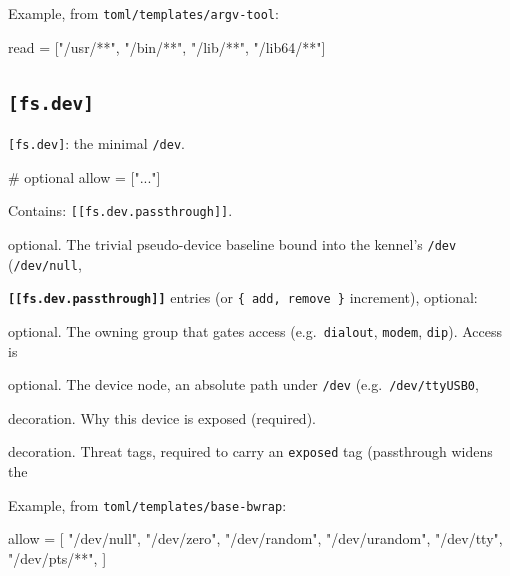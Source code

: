 Example, from \texttt{toml/templates/argv-tool}:

\begin{kennelcode}
[fs]
read = ["/usr/**", "/bin/**", "/lib/**", "/lib64/**"]
\end{kennelcode}

\hypertarget{fs.dev}{%
\subsection{\texorpdfstring{\texttt{{[}fs.dev{]}}}{{[}fs.dev{]}}}\label{fs.dev}}

\texttt{{[}fs.dev{]}}: the minimal \texttt{/dev}.

\begin{kennelcode}
[fs.dev]
# optional
allow    = ["..."]
\end{kennelcode}

Contains: \texttt{{[}{[}fs.dev.passthrough{]}{]}}.

\begin{description}
\tightlist
\item[\texttt{allow}]
optional. The trivial pseudo-device baseline bound into the kennel's
\texttt{/dev} (\texttt{/dev/null},
\end{description}

\textbf{\texttt{{[}{[}fs.dev.passthrough{]}{]}}} entries (or
\texttt{\{\ add,\ remove\ \}} increment), optional:

\begin{description}
\tightlist
\item[\texttt{group}]
optional. The owning group that gates access (e.g.~\texttt{dialout},
\texttt{modem}, \texttt{dip}). Access is
\item[\texttt{path}]
optional. The device node, an absolute path under \texttt{/dev}
(e.g.~\texttt{/dev/ttyUSB0},
\item[\texttt{reason}]
decoration. Why this device is exposed (required).
\item[\texttt{threats}]
decoration. Threat tags, required to carry an \texttt{exposed} tag
(passthrough widens the
\end{description}

Example, from \texttt{toml/templates/base-bwrap}:

\begin{kennelcode}
[fs.dev]
allow = [
    "/dev/null", "/dev/zero", "/dev/random", "/dev/urandom",
    "/dev/tty", "/dev/pts/**",
]
\end{kennelcode}

